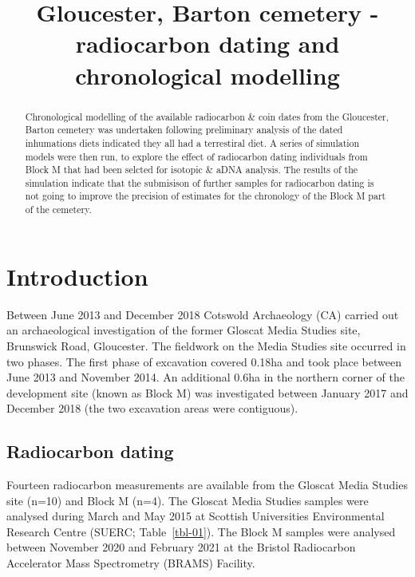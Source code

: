\documentclass[
]{agujournal2019}
\renewcommand*\contentsname{Table of contents}
\newcommand\contentsname{Table of contents}
\begin{document}
\title{Gloucester, Barton cemetery - radiocarbon dating and
chronological modelling}



\begin{abstract}
Chronological modelling of the available radiocarbon \& coin dates from
the Gloucester, Barton cemetery was undertaken following preliminary
analysis of the dated inhumations diets indicated they all had a
terrestiral diet. A series of simulation models were then run, to
explore the effect of radiocarbon dating individuals from Block M that
had been selcted for isotopic \& aDNA analysis. The results of the
simulation indicate that the submisison of further samples for
radiocarbon dating is not going to improve the precision of estimates
for the chronology of the Block M part of the cemetery.
\end{abstract}




\renewcommand*\contentsname{Table of contents}
{
\hypersetup{linkcolor=}
\setcounter{tocdepth}{3}
\tableofcontents
}

\section{Introduction}\label{introduction}

Between June 2013 and December 2018 Cotswold Archaeology (CA) carried
out an archaeological investigation of the former Gloscat Media Studies
site, Brunswick Road, Gloucester. The fieldwork on the Media Studies
site occurred in two phases. The first phase of excavation covered
0.18ha and took place between June 2013 and November 2014. An additional
0.6ha in the northern corner of the development site (known as Block M)
was investigated between January 2017 and December 2018 (the two
excavation areas were contiguous).

\subsection{Radiocarbon dating}\label{radiocarbon-dating}

Fourteen radiocarbon measurements are available from the Gloscat Media
Studies site (n=10) and Block M (n=4). The Gloscat Media Studies samples
were analysed during March and May 2015 at Scottish Universities
Environmental Research Centre (SUERC; Table~\ref{tbl-01}). The Block M
samples were analysed between November 2020 and February 2021 at the
Bristol Radiocarbon Accelerator Mass Spectrometry (BRAMS) Facility.
\end{document}
